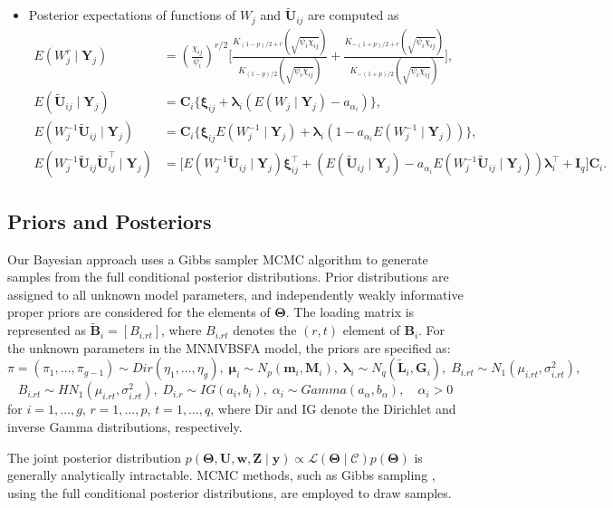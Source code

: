 \documentclass[twoside]{article}
\theoremstyle{definition}
\begin{document}
\begin{itemize}
	\item Posterior expectations of functions of $W_j$ and $\tilde{\bm U}_{ij}$ are computed as
	\begin{align*}
		E(W_j^r \mid \bm Y_j) &= \left(\frac{\chi_{ij}}{\psi_i}\right)^{r/2} \Bigg[ \frac{K_{(1-p)/2+r}(\sqrt{\psi_i \chi_{ij}})}{K_{(1-p)/2}(\sqrt{\psi_i \chi_{ij}})} + \frac{K_{-(1+p)/2+r}(\sqrt{\psi_i \chi_{ij}})}{K_{-(1+p)/2}(\sqrt{\psi_i \chi_{ij}})} \Bigg],\\
		E(\tilde{\bm U}_{ij} \mid \bm Y_j) &= \bm C_i \{\bm\xi_{ij} + \bm\lambda_i(E(W_j \mid \bm Y_j) - a_{\alpha_i})\},\\
		E(W_j^{-1} \tilde{\bm U}_{ij} \mid \bm Y_j) &= \bm C_i \{\bm\xi_{ij} E(W_j^{-1} \mid \bm Y_j) + \bm\lambda_i(1 - a_{\alpha_i} E(W_j^{-1} \mid \bm Y_j))\},\\
		E(W_j^{-1} \tilde{\bm U}_{ij} \tilde{\bm U}_{ij}^\top \mid \bm Y_j) &= \Big[ E(W_j^{-1}\tilde{\bm U}_{ij} \mid \bm Y_j) \bm\xi_{ij}^\top + (E(\tilde{\bm U}_{ij} \mid \bm Y_j) - a_{\alpha_i} E(W_j^{-1} \tilde{\bm U}_{ij} \mid \bm Y_j)) \bm\lambda_i^\top + \bm I_q \Big] \bm C_i.
	\end{align*}
\end{itemize}
\subsection{Priors and Posteriors}
\vspace{-0.5cm}
Our Bayesian approach uses a Gibbs sampler MCMC algorithm to generate samples from the full conditional posterior distributions. Prior distributions are assigned to all unknown model parameters, and independently weakly informative proper priors are considered for the elements of $\bm\Theta$. The loading matrix is represented as $\tilde{\bm B}_i = [B_{i.rt}]$, where $B_{i.rt}$ denotes the $(r,t)$ element of $\bm B_i$. For the unknown parameters in the MNMVBSFA model, the priors are specified as:
\[
\pi = (\pi_1, \dots, \pi_{g-1}) \sim Dir(\eta_1, \dots, \eta_g), \; 
\bm\mu_i \sim N_p(\bm m_i, \bm M_i), \;
\bm\lambda_i \sim N_q(\tilde{\bm L}_i, \bm {G}_i),\;B_{i.rt} \sim N_1(\mu_{i.rt}, \sigma^2_{i.rt}),
\]
\[
B_{i.rt} \sim HN_1(\mu_{i.rt}, \sigma^2_{i.rt}), \;
D_{i.r} \sim IG(a_i, b_i), \;
\alpha_i \sim Gamma(a_\alpha, b_\alpha), \quad \alpha_i > 0
\]
for $i=1,\dots,g$, $r=1,\dots,p$, $t=1,\dots,q$, where Dir and IG denote the Dirichlet and inverse Gamma distributions, respectively.

The joint posterior distribution $p(\bm\Theta, \bm U, \bm w, \bm Z \mid \bm y) \propto \mathcal{L}(\bm\Theta \mid \mathcal{C}) p(\bm\Theta)$ is generally analytically intractable. MCMC methods, such as Gibbs sampling \citep{Gelfand:1990}, using the full conditional posterior distributions, are employed to draw samples.
\end{document}
